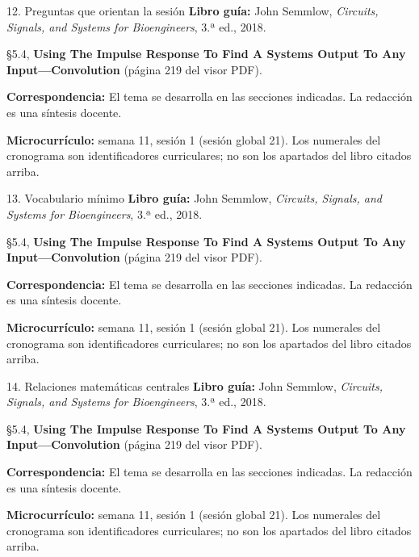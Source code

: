\documentclass[
  10pt,
  ignorenonframetext,
  aspectratio=169,
  spanish,
]{beamer}
\begin{document}
\begin{frame}{12. Preguntas que orientan la sesión}
\label{preguntas-que-orientan-la-sesiuxf3n}
\textbf{Libro guía:} John Semmlow, \emph{Circuits, Signals, and Systems
for Bioengineers}, 3.ª ed., 2018.

§5.4, \textbf{Using The Impulse Response To Find A Systems Output To Any
Input---Convolution} (página 219 del visor PDF).

\textbf{Correspondencia:} El tema se desarrolla en las secciones
indicadas. La redacción es una síntesis docente.

\textbf{Microcurrículo:} semana 11, sesión 1 (sesión global 21). Los
numerales del cronograma son identificadores curriculares; no son los
apartados del libro citados arriba.
\end{frame}

\begin{frame}{13. Vocabulario mínimo}
\label{vocabulario-muxednimo}
\textbf{Libro guía:} John Semmlow, \emph{Circuits, Signals, and Systems
for Bioengineers}, 3.ª ed., 2018.

§5.4, \textbf{Using The Impulse Response To Find A Systems Output To Any
Input---Convolution} (página 219 del visor PDF).

\textbf{Correspondencia:} El tema se desarrolla en las secciones
indicadas. La redacción es una síntesis docente.

\textbf{Microcurrículo:} semana 11, sesión 1 (sesión global 21). Los
numerales del cronograma son identificadores curriculares; no son los
apartados del libro citados arriba.
\end{frame}

\begin{frame}{14. Relaciones matemáticas centrales}
\label{relaciones-matemuxe1ticas-centrales}
\textbf{Libro guía:} John Semmlow, \emph{Circuits, Signals, and Systems
for Bioengineers}, 3.ª ed., 2018.

§5.4, \textbf{Using The Impulse Response To Find A Systems Output To Any
Input---Convolution} (página 219 del visor PDF).

\textbf{Correspondencia:} El tema se desarrolla en las secciones
indicadas. La redacción es una síntesis docente.

\textbf{Microcurrículo:} semana 11, sesión 1 (sesión global 21). Los
numerales del cronograma son identificadores curriculares; no son los
apartados del libro citados arriba.
\end{frame}
\end{document}
